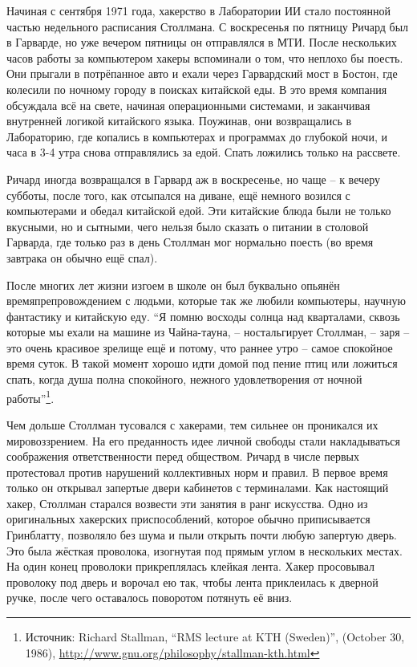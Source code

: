 Начиная с сентября 1971 года, хакерство в Лаборатории ИИ стало постоянной частью недельного расписания Столлмана. С воскресенья по пятницу Ричард был в Гарварде, но уже вечером пятницы он отправлялся в МТИ. После нескольких часов работы за компьютером хакеры вспоминали о том, что неплохо бы поесть. Они прыгали в потрёпанное авто и ехали через Гарвардский мост в Бостон, где колесили по ночному городу в поисках китайской еды. В это время компания обсуждала всё на свете, начиная операционными системами, и заканчивая внутренней логикой китайского языка. Поужинав, они возвращались в Лабораторию, где копались в компьютерах и программах до глубокой ночи, и часа в 3-4 утра снова отправлялись за едой. Спать ложились только на рассвете.

Ричард иногда возвращался в Гарвард аж в воскресенье, но чаще -- к вечеру субботы, после того, как отсыпался на диване, ещё немного возился с компьютерами и обедал китайской едой. Эти китайские блюда были не только вкусными, но и сытными, чего нельзя было сказать о питании в столовой Гарварда, где только раз в день Столлман мог нормально поесть (во время завтрака он обычно ещё спал).

После многих лет жизни изгоем в школе он был буквально опьянён времяпрепровождением с людьми, которые так же любили компьютеры, научную фантастику и китайскую еду. \enquote{Я помню восходы солнца над кварталами, сквозь которые мы ехали на машине из Чайна-тауна, -- ностальгирует Столлман, -- заря -- это очень красивое зрелище ещё и потому, что раннее утро -- самое спокойное время суток. В такой момент хорошо идти домой под пение птиц или ложиться спать, когда душа полна спокойного, нежного удовлетворения от ночной работы}\footnote{Источник: Richard Stallman, \enquote{RMS lecture at KTH (Sweden)}, (October 30, 1986), \url{http://www.gnu.org/philosophy/stallman-kth.html}}.

Чем дольше Столлман тусовался с хакерами, тем сильнее он проникался их мировоззрением. На его преданность идее личной свободы стали накладываться соображения ответственности перед обществом. Ричард в числе первых протестовал против нарушений коллективных норм и правил. В первое время только он открывал запертые двери кабинетов с терминалами. Как настоящий хакер, Столлман старался возвести эти занятия в ранг искусства. Одно из оригинальных хакерских приспособлений, которое обычно приписывается Гринблатту, позволяло без шума и пыли открыть почти любую запертую дверь. Это была жёсткая проволока, изогнутая под прямым углом в нескольких местах. На один конец проволоки прикреплялась клейкая лента. Хакер просовывал проволоку под дверь и ворочал ею так, чтобы лента приклеилась к дверной ручке, после чего оставалось поворотом потянуть её вниз.

